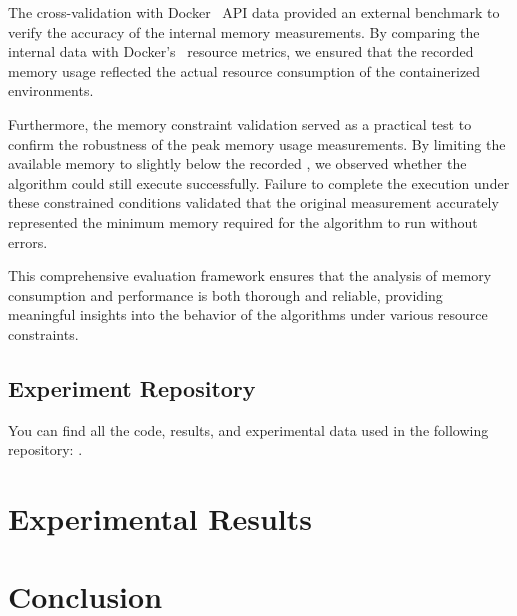 The cross-validation with Docker~\cite{docker} API data provided an external benchmark to verify the accuracy of the internal memory measurements.
By comparing the internal data with Docker's~\cite{docker} resource metrics, we ensured that the recorded memory usage reflected the actual resource consumption of the containerized environments.

Furthermore, the memory constraint validation served as a practical test to confirm the robustness of the peak memory usage measurements.
By limiting the available memory to slightly below the recorded \Mpeak, we observed whether the algorithm could still execute successfully.
Failure to complete the execution under these constrained conditions validated that the original \Mpeak measurement accurately represented the minimum memory required for the algorithm to run without errors.

This comprehensive evaluation framework ensures that the analysis of memory consumption and performance is both thorough and reliable, providing meaningful insights into the behavior of the algorithms under various resource constraints.

\subsection{Experiment Repository}
\label{subsec:mmc-experiment-repository}

You can find all the code, results, and experimental data used in the following repository: .


\section{Experimental Results}
\label{sec:mmc-results}



\section{Conclusion}
\label{sec:mmc-conclusion}

